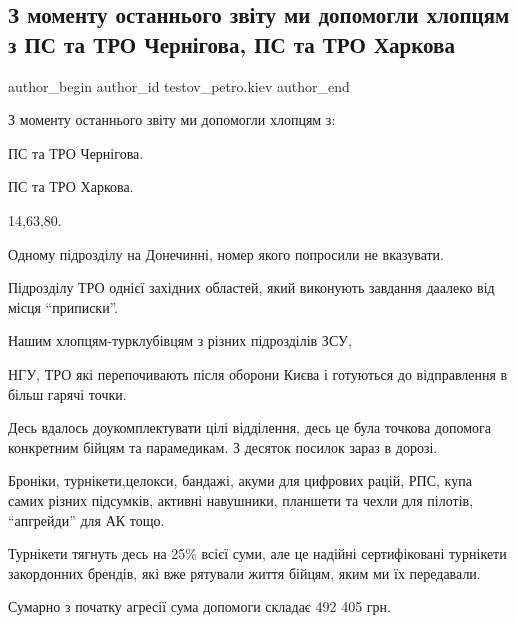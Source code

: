  
 
 
 
 
 
\subsection{З моменту останнього звіту ми допомогли хлопцям з ПС та ТРО Чернігова, ПС та ТРО Харкова}
\label{sec:15_04_2022.fb.testov_petro.kiev.1.zvit_chernigov_harkov}
 
\ifcmt
 author_begin
   author_id testov_petro.kiev
 author_end
\fi

З моменту останнього звіту ми допомогли хлопцям з: 

ПС та ТРО Чернігова.

ПС та ТРО Харкова.

14,63,80.

Одному підрозділу на Донечинні, номер якого попросили не вказувати. 

Підрозділу ТРО однієї західних областей, який виконують завдання даалеко від
місця \enquote{приписки}.

Нашим хлопцям-турклубівцям з різних підрозділів ЗСУ, 

НГУ, ТРО які перепочивають після оборони Києва і готуються до відправлення в
більш гарячі точки. 

Десь вдалось доукомплектувати цілі відділення, десь це була  точкова допомога
конкретним бійцям та парамедикам. З десяток посилок зараз в дорозі. 

Броніки, турнікети,целокси, бандажі, акуми для цифрових рацій, РПС, купа самих
різних підсумків, активні навушники, планшети та чехли для пілотів, \enquote{апгрейди}
для АК тощо. 

Турнікети тягнуть десь на 25\% всієї суми, але це надійні сертифіковані
турнікети закордонних брендів, які вже рятували життя бійцям, яким ми їх
передавали. 

Сумарно з початку агресії сума допомоги складає  492 405 грн. 

